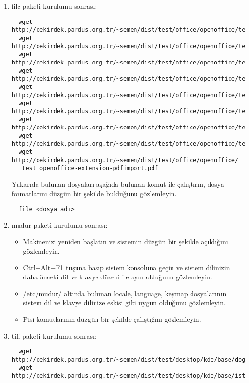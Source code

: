 \documentclass[a4paper,10pt]{article}
\begin{document}
\begin{enumerate}
\begin{itemize}
\end{itemize}


\item file paketi kurulumu sonrası:

\begin{verbatim}
  wget http://cekirdek.pardus.org.tr/~semen/dist/test/office/openoffice/test_oodraw.mng
  wget http://cekirdek.pardus.org.tr/~semen/dist/test/office/openoffice/test_oodraw.odg
  wget http://cekirdek.pardus.org.tr/~semen/dist/test/office/openoffice/test_oodraw.jpg
  wget http://cekirdek.pardus.org.tr/~semen/dist/test/office/openoffice/test_oodraw.gif
  wget http://cekirdek.pardus.org.tr/~semen/dist/test/office/openoffice/test_oodraw.png
  wget http://cekirdek.pardus.org.tr/~semen/dist/test/office/openoffice/test_oodraw.tif
  wget http://cekirdek.pardus.org.tr/~semen/dist/test/office/openoffice/test_oowriter.txt
  wget http://cekirdek.pardus.org.tr/~semen/dist/test/office/openoffice/test_oodraw.ps
  wget http://cekirdek.pardus.org.tr/~semen/dist/test/office/openoffice/
   test_openoffice-extension-pdfimport.pdf
\end{verbatim}

Yukarıda bulunan dosyaları aşağıda bulunan komut ile çalıştırın, dosya formatlarını düzgün bir şekilde bulduğunu gözlemleyin.
\begin{verbatim}
  file <dosya adı>
\end{verbatim}

\item mudur paketi kurulumu sonrası:

\begin{itemize}
  \item Makinenizi yeniden başlatın ve sistemin düzgün bir şekilde açıldığını  gözlemleyin.
 \item Ctrl+Alt+F1 tuşuna basıp sistem konsoluna geçin ve sistem dilinizin daha önceki dil ve klavye düzeni ile aynı olduğunu gözlemleyin.
  \item /etc/mudur/ altında bulunan locale, language, keymap dosyalarının sistem dil ve klavye dilinize eskisi gibi uygun olduğunu gözlemleyin.
 \item Pisi komutlarının düzgün bir şekilde çalıştığını gözlemleyin. 

\end{itemize}
\item tiff paketi kurulumu sonrası:
\begin{verbatim}
  wget http://cekirdek.pardus.org.tr/~semen/dist/test/desktop/kde/base/doga.tiff
  wget http://cekirdek.pardus.org.tr/~semen/dist/test/desktop/kde/base/istanbul.tiff
\end{verbatim}


\end{enumerate}
\end{document}
